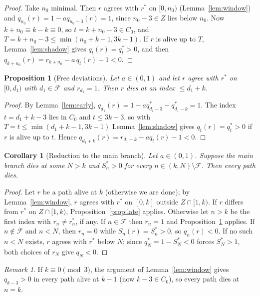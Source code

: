 \documentclass[11pt]{amsart}
\newtheorem{proposition}[theorem]{Proposition}
\newtheorem{corollary}[theorem]{Corollary}
\theoremstyle{definition}
\theoremstyle{remark}
\newtheorem{remark}[theorem]{Remark}
\newcommand{\Cz}{C_0}
\newcommand{\F}{\mathcal{F}}
\begin{document}
\begin{proof}
Take $n_0$ minimal. Then $r$ agrees with $r^*$ on $[0,n_0)$ (Lemma~\ref{lem:window})
and $q_{n_0}(r)=1-aq_{n_0-3}(r)=1$, since $n_0-3\in Z$ lies below $n_0$.
Now $k+n_0\equiv k-k\equiv 0$, so $t=k+n_0-3\in\Cz$, and
$T=k+n_0-3\le\min(n_0+k-1,3k-1)$. If $r$ is alive up to $T$,
Lemma~\ref{lem:shadow} gives $q_t(r)=q^*_t>0$, and then
$q_{k+n_0}(r)=r_{k+n_0}-a\,q_t(r)-1<0$.
\end{proof}

\begin{proposition}[Free deviations]\label{prop:free}
Let $a\in(0,1)$ and let $r$ agree with $r^*$ on $[0,d_1)$ with $d_1\in\F$ and
$r_{d_1}=1$. Then $r$ dies at an index $\le d_1+k$.
\end{proposition}

\begin{proof}
By Lemma~\ref{lem:early}, $q_{d_1}(r)=1-aq^*_{d_1-3}-q^*_{d_1-k}=1$. The index
$t=d_1+k-3$ lies in $\Cz$ and $t\le 3k-3$, so with $T=t\le\min(d_1+k-1,3k-1)$
Lemma~\ref{lem:shadow} gives $q_t(r)=q^*_t>0$ if $r$ is alive up to $t$. Hence
$q_{d_1+k}(r)=r_{d_1+k}-aq_t(r)-1<0$.
\end{proof}

\begin{corollary}[Reduction to the main branch]\label{cor:reduce}
Let $a\in(0,1)$. Suppose the main branch dies at some $N>k$ and $S^*_n>0$ for
every $n\in(k,N)\setminus\F$. Then every path dies.
\end{corollary}

\begin{proof}
Let $r$ be a path alive at $k$ (otherwise we are done); by Lemma~\ref{lem:window},
$r$ agrees with $r^*$ on $[0,k]$ outside $Z\cap[1,k)$. If $r$ differs from $r^*$ on
$Z\cap[1,k)$, Proposition~\ref{prop:late} applies. Otherwise let $n>k$ be the first
index with $r_n\ne r^*_n$, if any. If $n\in\F$ then $r_n=1$ and
Proposition~\ref{prop:free} applies. If $n\notin\F$ and $n<N$, then $r_n=0$ while
$S_n(r)=S^*_n>0$, so $q_n(r)<0$. If no such $n<N$ exists, $r$ agrees with $r^*$ below
$N$; since $q^*_N=1-S^*_N<0$ forces $S^*_N>1$, both choices of $r_N$ give $q_N<0$.
\end{proof}

\begin{remark}\label{rem:trivial}
If $k\equiv 0\pmod 3$, the argument of Lemma~\ref{lem:window} gives $q_{k-3}>0$
in every path alive at $k-1$ (now $k-3\in\Cz$), so every path dies at $n=k$.
\end{remark}
\end{document}
